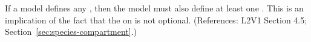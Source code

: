 If a model defines any \Species, then the model must also define at least
one \Compartment.  This is an implication of the fact that the
  on \Species is not optional.  (References: L2V1
Section 4.5; Section~\ref{sec:species-compartment}.)
